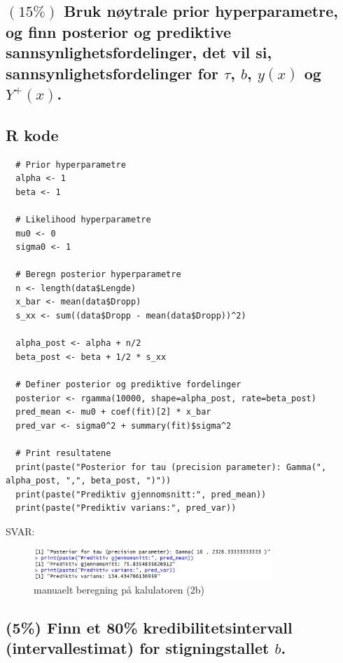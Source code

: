 \documentclass[12pt]{article}
\begin{document}
\subsection{ $(15\%)$ Bruk nøytrale prior hyperparametre, og finn posterior og prediktive sannsynlighetsfordelinger, det vil si, sannsynlighetsfordelinger for $\tau$, $b$, $y(x)$ og $Y^+(x)$.}
\subsection{R kode}
\begin{verbatim}
  # Prior hyperparametre
  alpha <- 1
  beta <- 1
  
  # Likelihood hyperparametre
  mu0 <- 0
  sigma0 <- 1
  
  # Beregn posterior hyperparametre
  n <- length(data$Lengde)
  x_bar <- mean(data$Dropp)
  s_xx <- sum((data$Dropp - mean(data$Dropp))^2)
  
  alpha_post <- alpha + n/2
  beta_post <- beta + 1/2 * s_xx
  
  # Definer posterior og prediktive fordelinger
  posterior <- rgamma(10000, shape=alpha_post, rate=beta_post)
  pred_mean <- mu0 + coef(fit)[2] * x_bar
  pred_var <- sigma0^2 + summary(fit)$sigma^2
  
  # Print resultatene
  print(paste("Posterior for tau (precision parameter): Gamma(", alpha_post, ",", beta_post, ")"))
  print(paste("Prediktiv gjennomsnitt:", pred_mean))
  print(paste("Prediktiv varians:", pred_var))  
\end{verbatim} 
SVAR:
\begin{figure}[H]
  \centering
  \includegraphics[width=0.8\textwidth]{3b.png}
  \caption{manuaelt beregning på kalulatoren (2b)}
\end{figure}

\subsection{(5\%) Finn et 80\% kredibilitetsintervall (intervallestimat) for stigningstallet $b$.}
\end{document}
